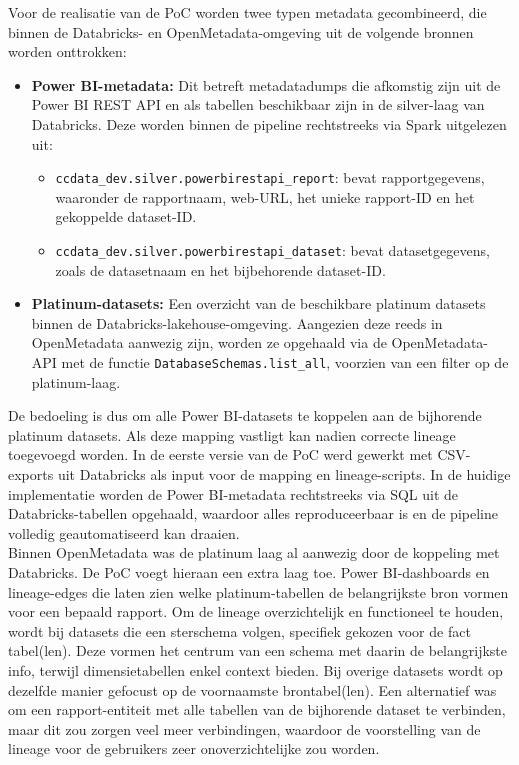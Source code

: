 Voor de realisatie van de PoC worden twee typen metadata gecombineerd, die binnen de Databricks- en OpenMetadata-omgeving uit de volgende bronnen worden onttrokken:

\begin{itemize}
	\item \textbf{Power BI-metadata:} Dit betreft metadatadumps die afkomstig zijn uit de Power BI REST API en als tabellen beschikbaar zijn in de silver-laag van Databricks. Deze worden binnen de pipeline rechtstreeks via Spark uitgelezen uit:
	\begin{itemize}
		\item \texttt{ccdata_dev.silver.powerbirestapi_report}: bevat rapportgegevens, waaronder de rapportnaam, web-URL, het unieke rapport-ID en het gekoppelde dataset-ID.
		\item \texttt{ccdata_dev.silver.powerbirestapi_dataset}: bevat datasetgegevens, zoals de datasetnaam en het bijbehorende dataset-ID.
	\end{itemize}
	\item \textbf{Platinum-datasets:} Een overzicht van de beschikbare platinum datasets binnen de Databricks-lakehouse-omgeving. Aangezien deze reeds in OpenMetadata aanwezig zijn, worden ze opgehaald via de OpenMetadata-API met de functie \texttt{DatabaseSchemas.list_all}, voorzien van een filter op de platinum-laag.
\end{itemize}

De bedoeling is dus om alle Power BI-datasets te koppelen aan de bijhorende platinum datasets. Als deze mapping vastligt kan nadien correcte lineage toegevoegd worden. In de eerste versie van de PoC werd gewerkt met CSV-exports uit Databricks als input voor de mapping en lineage-scripts. In de huidige implementatie worden de Power BI-metadata rechtstreeks via SQL uit de Databricks-tabellen opgehaald, waardoor alles reproduceerbaar is en de pipeline volledig geautomatiseerd kan draaien.\\

Binnen OpenMetadata was de platinum laag al aanwezig door de koppeling met Databricks. De PoC voegt hieraan een extra laag toe. Power BI-dashboards en lineage-edges die laten zien welke platinum-tabellen de belangrijkste bron vormen voor een bepaald rapport. Om de lineage overzichtelijk en functioneel te houden, wordt bij datasets die een sterschema volgen, specifiek gekozen voor de fact tabel(len). Deze vormen het centrum van een schema met daarin de belangrijkste info, terwijl dimensietabellen enkel context bieden. Bij overige datasets wordt op dezelfde manier gefocust op de voornaamste brontabel(len). Een alternatief was om een rapport-entiteit met alle tabellen van de bijhorende dataset te verbinden, maar dit zou zorgen veel meer verbindingen, waardoor de voorstelling van de lineage voor de gebruikers zeer onoverzichtelijke zou worden.

